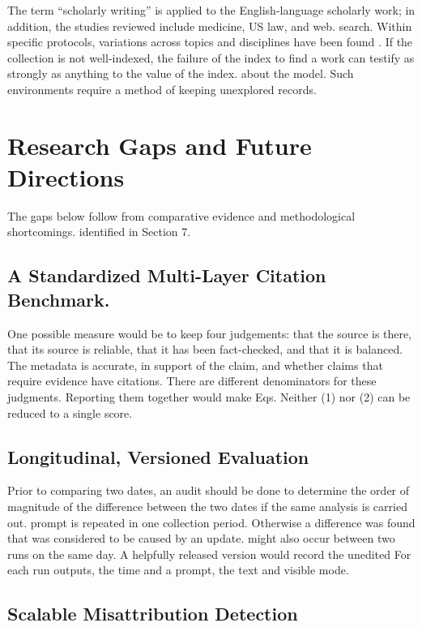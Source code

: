 \documentclass[acmsmall,screen,nonacm]{acmart}
\begin{document}
The term “scholarly writing” is applied to the English-language scholarly work; in addition, the studies reviewed include medicine, US law, and web. search. Within specific protocols, variations across topics and disciplines have been found \cite{ref12,ref17}. If the collection is not well-indexed, the failure of the index to find a work can testify as strongly as anything to the value of the index. about the model. Such environments require a method of keeping unexplored records.

\section{Research Gaps and Future Directions}

The gaps below follow from comparative evidence and methodological shortcomings. identified in Section 7.

\subsection{A Standardized Multi-Layer Citation Benchmark.}

One possible measure would be to keep four judgements: that the source is there, that its source is reliable, that it has been fact-checked, and that it is balanced. The metadata is accurate, in support of the claim, and whether claims that require evidence have citations. There are different denominators for these judgments. Reporting them together would make Eqs. Neither (1) nor (2) can be reduced to a single score.

\subsection{Longitudinal, Versioned Evaluation}

Prior to comparing two dates, an audit should be done to determine the order of magnitude of the difference between the two dates if the same analysis is carried out. prompt is repeated in one collection period. Otherwise a difference was found that was considered to be caused by an update. might also occur between two runs on the same day. A helpfully released version would record the unedited For each run outputs, the time and a prompt, the text and visible mode.

\subsection{Scalable Misattribution Detection}
\end{document}
